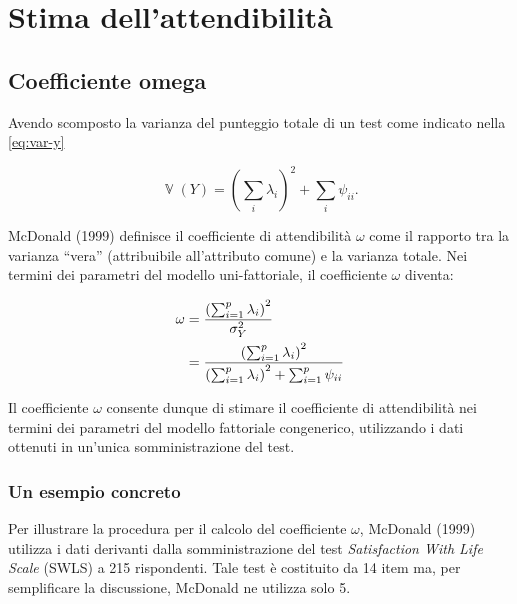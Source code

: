 \documentclass[
  11pt,
]{krantz}
\DeclareMathOperator{\V}{\mathbb{V}} %
\theoremstyle{definition}
\theoremstyle{definition}
\theoremstyle{definition}
\theoremstyle{definition}
\theoremstyle{remark}
\begin{document}
\hypertarget{stima-dellattendibilituxe0}{%
\section{Stima dell'attendibilità}\label{stima-dellattendibilituxe0}}

\hypertarget{coefficiente-omega}{%
\subsection{Coefficiente omega}\label{coefficiente-omega}}

Avendo scomposto la varianza del punteggio totale di un test come indicato nella \eqref{eq:var-y}

\[
\V(Y) = \left( \sum_i \lambda_i\right)^2 + \sum_i \psi_{ii}.
\]

McDonald (1999) definisce il coefficiente di attendibilità \(\omega\) come il rapporto tra la varianza ``vera'' (attribuibile all'attributo comune) e la varianza totale. Nei termini dei parametri del modello uni-fattoriale, il coefficiente \(\omega\) diventa:

\begin{equation}
\begin{aligned}
\omega &= \frac{\left( \sum_{i=1}^p \lambda_i \right)^2}{\sigma_Y^2} \notag\\
&= \frac{\left( \sum_{i=1}^p \lambda_i \right)^2}{\left( \sum_{i=1}^p \lambda_i \right)^2  + \sum_{i=1}^p \psi_{ii}}
\end{aligned}
\label{eq:omega}
\end{equation}

Il coefficiente \(\omega\) consente dunque di stimare il coefficiente di attendibilità nei termini dei parametri del modello fattoriale congenerico, utilizzando i dati ottenuti in un'unica somministrazione del test.

\hypertarget{un-esempio-concreto}{%
\subsubsection{Un esempio concreto}\label{un-esempio-concreto}}

Per illustrare la procedura per il calcolo del coefficiente \(\omega\), McDonald (1999) utilizza i dati derivanti dalla somministrazione del test \emph{Satisfaction With Life Scale} (SWLS) a 215 rispondenti. Tale test è costituito da 14 item ma, per semplificare la discussione, McDonald ne utilizza solo 5.
\end{document}
